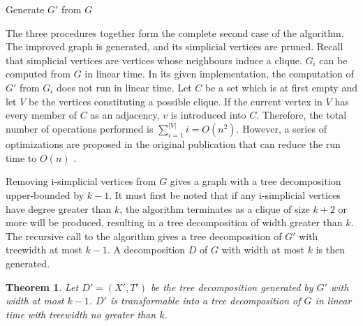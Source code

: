 \documentclass[12pt,conference]{IEEEtran}
\theoremstyle{plain}
\newtheorem{theorem}{Theorem}
\begin{document}
\begin{algorithm}
  \caption{Generate $G'$ from $G$}
  \label{improved_graph_generate}
  \begin{algorithmic}[1]
    \EndIf
  \EndFor
  \EndFor
  \EndProcedure
\State{}
      \EndIf
  \EndFor
  \EndProcedure
\State{}

      \EndIf
    \EndFor
  \EndFor
  \EndProcedure
  \end{algorithmic}
\end{algorithm}

The three procedures together form the complete second case of the algorithm. The improved graph is generated, and its simplicial vertices are pruned. Recall that simplicial vertices are vertices whose neighbours induce a clique. $G_{i}$ can be computed from $G$ in linear time. In its given implementation, the computation of $G'$ from $G_{i}$ does not run in linear time. Let $C$ be a set which is at first empty and let $V$ be the vertices constituting a possible clique. If the current vertex in $V$ has every member of $C$ as an adjacency, $v$ is introduced into $C$. Therefore, the total number of operations performed is $\sum_{i=1}^{|V|}i=O(n^{2})$. However, a series of optimizations are proposed in the original publication that can reduce the run time to $O(n)$ \cite{bodlaender-1992}.

Removing i-simplicial vertices from $G$ gives a graph with a tree decomposition upper-bounded by $k-1$. It must first be noted that if any i-simplicial vertices have degree greater than $k$, the algorithm terminates as a clique of size $k+2$ or more will be produced, resulting in a tree decomposition of width greater than $k$. The recursive call to the algorithm gives a tree decomposition of $G'$ with treewidth at most $k-1$. A decomposition $D$ of $G$ with width at most $k$ is then generated.

\begin{theorem}
Let $D' = (X',T')$ be the tree decomposition generated by $G'$ with width at most $k-1$. $D'$ is transformable into a tree decomposition of $G$ in linear time with treewidth no greater than $k$.
\end{theorem}
\end{document}
